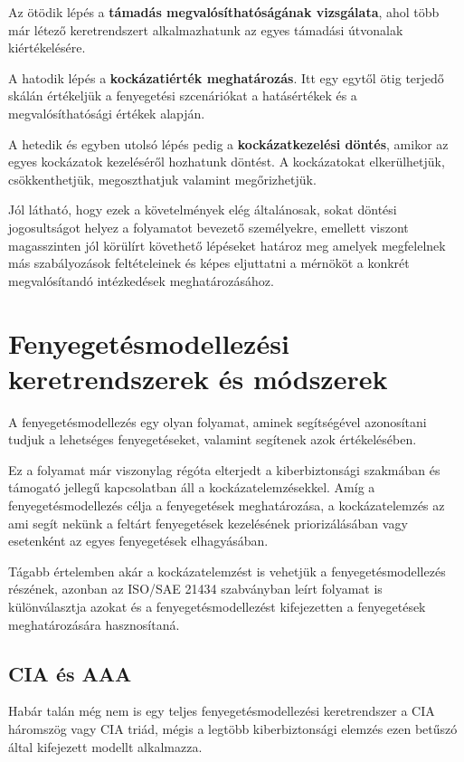 Az ötödik lépés a \textbf{támadás megvalósíthatóságának vizsgálata}, ahol több már létező keretrendszert alkalmazhatunk az egyes támadási útvonalak kiértékelésére. 

A hatodik lépés a \textbf{kockázatiérték meghatározás}. Itt egy egytől ötig terjedő skálán értékeljük a fenyegetési szcenáriókat a hatásértékek és a megvalósíthatósági értékek alapján.

A hetedik és egyben utolsó lépés pedig a \textbf{kockázatkezelési döntés}, amikor az egyes kockázatok kezeléséről hozhatunk döntést. A kockázatokat elkerülhetjük, csökkenthetjük, megoszthatjuk valamint megőrizhetjük.

Jól látható, hogy ezek a követelmények elég általánosak, sokat döntési jogosultságot helyez a folyamatot bevezető személyekre, emellett viszont magasszinten jól körülírt követhető lépéseket határoz meg amelyek megfelelnek más szabályozások feltételeinek és képes eljuttatni a mérnököt a konkrét megvalósítandó intézkedések meghatározásához. 

\section{Fenyegetésmodellezési keretrendszerek és módszerek}

A fenyegetésmodellezés egy olyan folyamat, aminek segítségével azonosítani tudjuk a lehetséges fenyegetéseket, valamint segítenek azok értékelésében.

Ez a folyamat már viszonylag régóta elterjedt a kiberbiztonsági szakmában és támogató jellegű kapcsolatban áll a kockázatelemzésekkel. Amíg a fenyegetésmodellezés célja a fenyegetések meghatározása, a kockázatelemzés az ami segít nekünk a feltárt fenyegetések kezelésének priorizálásában vagy esetenként az egyes fenyegetések elhagyásában.

Tágabb értelemben akár a kockázatelemzést is vehetjük a fenyegetésmodellezés részének, azonban az ISO/SAE 21434 szabványban leírt folyamat is különválasztja azokat és a fenyegetésmodellezést kifejezetten a fenyegetések meghatározására hasznosítaná.

\subsection{CIA és AAA}

Habár talán még nem is egy teljes fenyegetésmodellezési keretrendszer a CIA háromszög vagy CIA triád, mégis a legtöbb kiberbiztonsági elemzés ezen betűszó által kifejezett modellt alkalmazza.

